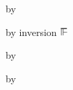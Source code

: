 {\begin{lamportproof*}
    \begin{pfproof}
      \qedstep
        \begin{pfproof}
          by \pfih
        \end{pfproof}
    \end{pfproof}

    \begin{pfproof}
        \begin{pfproof}
          by inversion $\sWSOP$
        \end{pfproof}
      \qedstep
        \begin{pfproof}
          by \pfih
        \end{pfproof}
    \end{pfproof}

    \begin{pfproof}
      \qedstep
        \begin{pfproof}
          by \pfih
        \end{pfproof}
    \end{pfproof}

\end{lamportproof*}}

